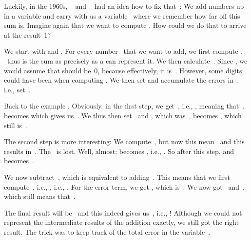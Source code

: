 Luckily, in the 1960s, \citeauthor{K1965PFRORTE}~\cite{K1965PFRORTE} and \citeauthor{B1968NSIMA}~\cite{B1968NSIMA} had an idea how to fix that~\cite{G1991WECSSKAFPA,L2020RWECSSKAFPA}:
We add numbers up in a  variable and carry with us a variable~ where we remember how far off this sum is.
Imagine again that we want to compute .
How could we do that to arrive at the result~1?

We start with  and .
For every number~ that we want to add, we first compute .
~thus is the sum as precisely as a  can represent it.
We then calculate~.
Since , we would assume that  should be~0, because effectively, it is~.
However, some digits could have been  when computing .
We then set  and accumulate the errors in~, i.e., set~.

Back to the example .
Obviously, in the first step, we get~, i.e., , meaning that~.
 becomes  which gives us~.
We thus then set~ and , which was~, becomes , which still is~.%
%
\begin{sloppypar}%
The second step is more interesting:
We compute~, but now this mean~ and this results in~.
The~ is lost.
Well, almost:
 becomes , i.e., .
So after this step,  and  becomes~.%
\end{sloppypar}%
%
\begin{sloppypar}%
We now subtract~, which is equivalent to adding~.
This means that we first compute~, i.e., , i.e., .
For the error term, we get , which is~.
We now got~ and~, which still means that~.%
\end{sloppypar}%
%
The final result will be~ and this indeed gives us~, i.e., !
Although we could not represent the intermediate results of the addition exactly, we still got the right result.
The trick was to keep track of the total error in the variable~.

